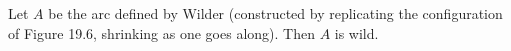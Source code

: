 Let $A$ be the arc defined by Wilder (constructed by replicating the configuration of Figure 19.6, shrinking as one goes along). Then $A$ is wild.
